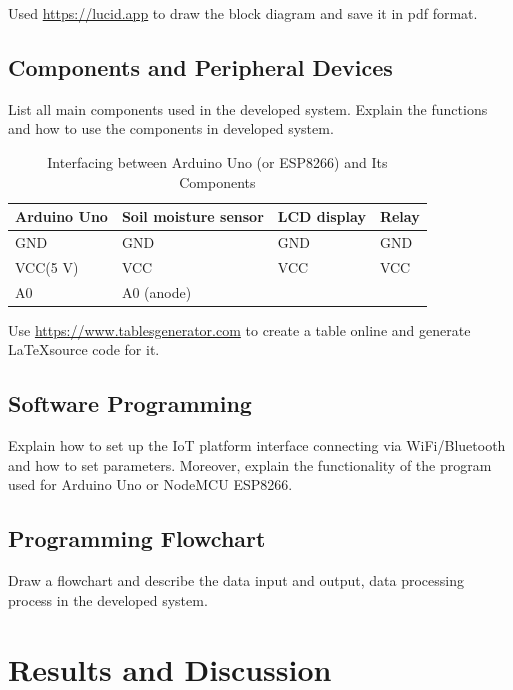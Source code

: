 \documentclass[conference, onecolumn]{IEEEtran}
\begin{document}
Used \href{https://lucid.app}{https://lucid.app} to draw the block diagram and save it in pdf format.

\subsection{Components and Peripheral Devices}
List all main components used in the developed system. Explain the functions and how to use the components in developed system.

\begin{table}[h]
	\caption{Interfacing between Arduino Uno (or ESP8266) and Its Components}
	\label{tab:my-table}
	\begin{center}
	\begin{tabular}{|l|l|l|l|}
		\hline
		\textbf{Arduino Uno} & \textbf{Soil moisture sensor} & \textbf{LCD display} & \textbf{Relay} \\ \hline
		GND         & GND                  & GND         & GND   \\ \hline
		VCC(5 V)    & VCC                  & VCC         & VCC   \\ \hline
		A0          & A0 (anode)           &             &       \\ \hline
	\end{tabular}
\end{center}
\end{table}

Use \href{https://www.tablesgenerator.com}{https://www.tablesgenerator.com} to create a table online and generate \LaTeX source code for it.

\subsection{Software Programming}
Explain how to set up the IoT platform interface connecting via WiFi/Bluetooth and how to set parameters. Moreover, explain the functionality of the program used for Arduino Uno or NodeMCU ESP8266.

\subsection{Programming Flowchart}
Draw a flowchart and describe the data input and output, data processing process in the developed system.

\section{Results and Discussion}
\end{document}
